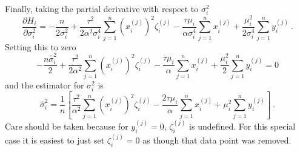 \documentclass[12pt]{report}
\begin{document}
Finally, taking the partial derivative with respect to $\sigma_i^2$
\begin{equation}
\frac{\partial H_i}{\partial \sigma_i^2} = -\frac{n}{2\sigma_i^2}+\frac{\tau^2}{2\alpha^2\sigma_i^4}\sum_{j=1}^n\left(x_i^{(j)}\right)^2\zeta_i^{(j)} - \frac{\tau\mu_i}{\alpha\sigma_i^4}\sum_{j=1}^nx_i^{(j)} + \frac{\mu_i^2}{2\sigma_i^4}\sum_{j=1}^ny_i^{(j)} \ .
\end{equation}
Setting this to zero
\begin{equation*}
-\frac{n\widehat{\sigma}_i^2}{2}+\frac{\tau^2}{2\alpha^2}\sum_{j=1}^n\left(x_i^{(j)}\right)^2\zeta_i^{(j)} - \frac{\tau\mu_i}{\alpha}\sum_{j=1}^nx_i^{(j)} + \frac{\mu_i^2}{2}\sum_{j=1}^ny_i^{(j)} = 0
\end{equation*}
and the estimator for $\sigma_i^2$ is
\begin{equation}
\widehat{\sigma}_i^2=\frac{1}{n}\left[
\frac{\tau^2}{\alpha^2}\sum_{j=1}^n\left(x_i^{(j)}\right)^2\zeta_i^{(j)}
-\frac{2\tau\mu_i}{\alpha}\sum_{j=1}^nx_i^{(j)}
+\mu_i^2\sum_{j=1}^ny_i^{(j)}
\right] \ .
\end{equation}
Care should be taken because for $y_i^{(j)}=0$, $\zeta_i^{(j)}$ is undefined. For this special case it is easiest to just set $\zeta_i^{(j)}=0$ as though that data point was removed.
\end{document}
